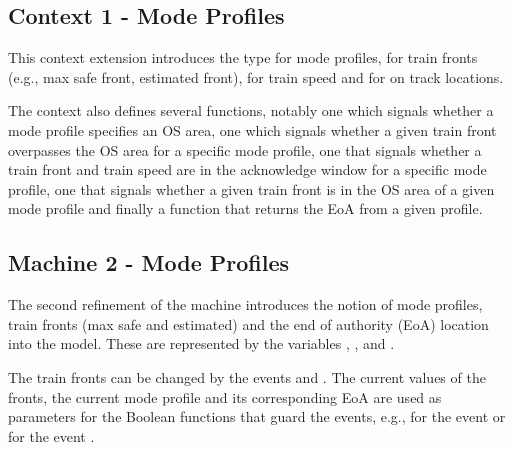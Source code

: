 \documentclass{template/openetcs_article}
\begin{document}
{\footnotesize

}

\subsection{Context 1 - Mode Profiles}
\label{sec:context-1-mode}

This context extension introduces the type  for mode
profiles,  for train fronts (e.g., max safe front,
estimated front),  for train speed and  for
on track locations.

The context also defines several functions, notably one which signals whether a
mode profile specifies an OS area, one which signals whether a given train front
overpasses the OS area for a specific mode profile, one that signals whether a
train front and train speed are in the acknowledge window for a specific mode
profile, one that signals whether a given train front is in the OS area of a
given mode profile and finally a function that returns the EoA from a given
profile.

{\footnotesize

}

\subsection{Machine 2 - Mode Profiles}
\label{sec:machine-2-mode}

The second refinement of the machine introduces the notion of mode profiles,
train fronts (max safe and estimated) and the end of authority (EoA) location
into the model. These are represented by the variables ,
,  and
.

The train fronts can be changed by the events 
and . The current values of the fronts, the current
mode profile and its corresponding EoA are used as parameters for the Boolean
functions that guard the events, e.g., for the event
 or for the event
.
\end{document}
